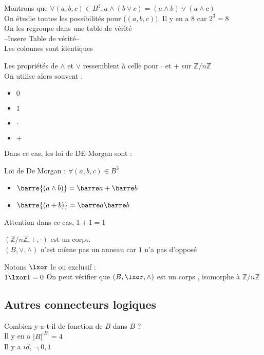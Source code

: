 \begin{dem}
    Montrons que $\forall (a,b,c) \in B^3, a\land(b\lor c)=(a\land b)\lor (a \land c)$ \\
    On étudie toutes les possibilités pour ($(a,b,c))$. Il y en a $8$ car $2^3=8$ \\
    On les regroupe dans une table de vérité \\

    --Insere Table de vérité-- \\

    Les colonnes sont identiques \\
\end{dem}

Les propriétés de $\land$ et $\lor$ ressemblent à celle pour $\cdot$ et $+$ sur $\mathbb{Z}/n\mathbb{Z}$ \\

On utilise alors souvent : 
\begin{itemize}
    \item $0$
    \item $1$
    \item $\cdot$
    \item $+$
\end{itemize}

Dans ce cas, les loi de DE Morgan sont :
\item Loi de De Morgan : $\forall (a,b,c) \in B^3$
\begin{itemize}
    \item $\barre{(a\land b)}= \barre a + \barre b$
    \item $\barre{(a + b)}= \barre a  \barre b$
\end{itemize}

Attention dans ce cas, $1+1=1$

\begin{rq}
    $(\mathbb{Z}/n\mathbb{Z},+,\cdot)$ est un corps. \\
    $(B,\lor,\land)$ n'est même pas un anneau car $1$ n'a pas d'opposé
\end{rq}

\begin{rq}
    Notons $\lxor$ le ou exclusif : \\
    $1\lxor 1=0$
    On peut vérifier que $(B,\lxor,\land)$ est un corps , isomorphe à $\mathbb{Z}/n\mathbb{Z}$
\end{rq}

\subsection{Autres connecteurs logiques}
Combien y-a-t-il de fonction de $B$ dans $B$ ? \\
Il y en a $|B|^{|B|}=4$ \\
Il y a $id,\lnot,0,1$ \\

